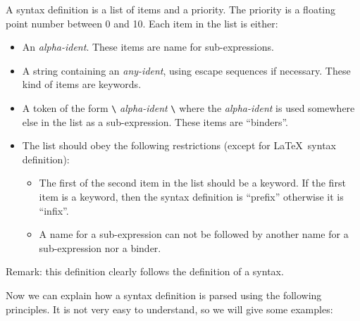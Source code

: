 A syntax definition is a list of items and a priority.
The priority is a floating point number between 0 and 10.
Each item in the list is either:
\begin{itemize}
\item An {\it alpha-ident}. These items are name for sub-expressions.
\item A string containing an {\it any-ident}, using escape sequences if
necessary. These kind of items are keywords.
\item A token of the form \verb#\# {\it alpha-ident} \verb#\# where
the {\it alpha-ident} is used somewhere else in the list as a
sub-expression. These items are ``binders''.
\item The list should obey the following restrictions (except for
\LaTeX\ syntax definition):
\begin{itemize}
\item The first of the second item in the list should be a keyword.
If the first item is a keyword, then the syntax definition is
``prefix'' otherwise it is ``infix''.
\item A  name for a sub-expression can not be followed by another
name for a sub-expression nor a binder.
\end{itemize}
\end{itemize}

Remark: this definition clearly follows the definition of a syntax.

Now we can explain how a syntax definition is parsed using the
following principles. It is not very easy to understand, so we will
give some examples:

